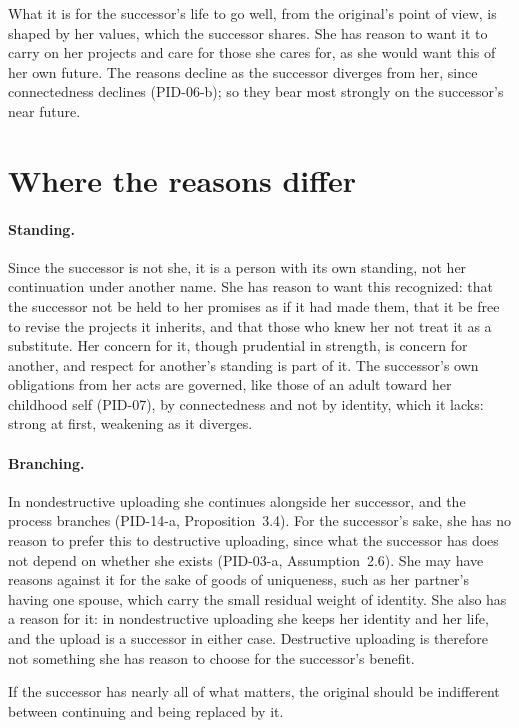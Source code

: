 \documentclass{situationist-preprint}
\begin{document}
What it is for the successor's life to go well, from the original's point of view, is shaped by her values, which the successor shares. She has reason to want it to carry on her projects and care for those she cares for, as she would want this of her own future. The reasons decline as the successor diverges from her, since connectedness declines (PID-06-b); so they bear most strongly on the successor's near future.

\section{Where the reasons differ}

\paragraph{Standing.} Since the successor is not she, it is a person with its own standing, not her continuation under another name. She has reason to want this recognized: that the successor not be held to her promises as if it had made them, that it be free to revise the projects it inherits, and that those who knew her not treat it as a substitute. Her concern for it, though prudential in strength, is concern for another, and respect for another's standing is part of it. The successor's own obligations from her acts are governed, like those of an adult toward her childhood self (PID-07), by connectedness and not by identity, which it lacks: strong at first, weakening as it diverges.

\paragraph{Branching.} In nondestructive uploading she continues alongside her successor, and the process branches (PID-14-a, Proposition~3.4). For the successor's sake, she has no reason to prefer this to destructive uploading, since what the successor has does not depend on whether she exists (PID-03-a, Assumption~2.6). She may have reasons against it for the sake of goods of uniqueness, such as her partner's having one spouse, which carry the small residual weight of identity. She also has a reason for it: in nondestructive uploading she keeps her identity and her life, and the upload is a successor in either case. Destructive uploading is therefore not something she has reason to choose for the successor's benefit.

\begin{objection}
If the successor has nearly all of what matters, the original should be indifferent between continuing and being replaced by it.
\end{objection}
\end{document}
